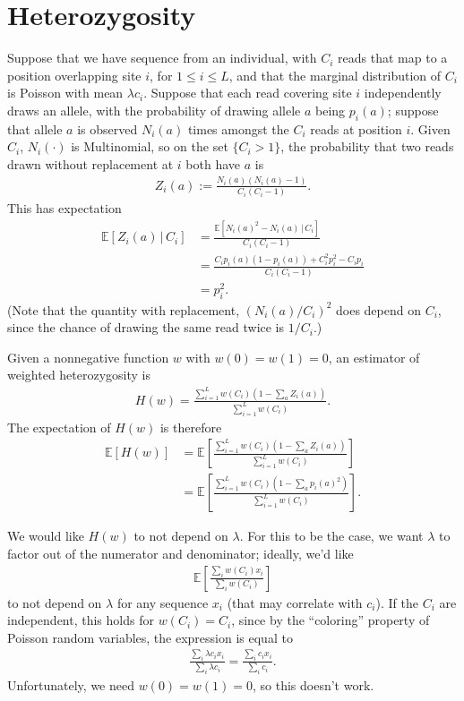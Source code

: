 \documentclass{article}
\newcommand{\E}{\mathbb{E}}
\newcommand{\given}{\,\vert\,}
\begin{document}
\section*{Heterozygosity}

Suppose that we have sequence from an individual,
with $C_i$ reads that map to a position overlapping site $i$, for $1 \le i \le L$,
and that the marginal distribution of $C_i$ is Poisson with mean $\lambda c_i$.
Suppose that each read covering site $i$ independently draws an allele,
with the probability of drawing allele $a$ being $p_i(a)$;
suppose that allele $a$ is observed $N_i(a)$ times amongst the $C_i$ reads at position $i$.
Given $C_i$, $N_i(\cdot)$ is Multinomial, so
on the set $\{ C_i > 1 \}$,
the probability that two reads drawn without replacement at $i$ both have $a$ is
\begin{align}
    Z_i(a) := \frac{N_i(a)(N_i(a)-1)}{C_i(C_i-1)} .
\end{align}
This has expectation
\begin{align}
\E\left[ Z_i(a) \given C_i \right] 
    & = \frac{ \E[ N_i(a)^2 - N_i(a) \given C_i ] }{ C_i (C_i-1) } \\
    & = \frac{ C_i p_i(a)(1-p_i(a)) + C_i^2 p_i^2 - C_i p_i }{ C_i (C_i-1) } \\
    & = p_i^2 .
\end{align}
(Note that the quantity with replacement, $(N_i(a)/C_i)^2$ does depend on $C_i$, 
since the chance of drawing the same read twice is $1/C_i$.)

Given a nonnegative function $w$ with $w(0)=w(1)=0$,
an estimator of weighted heterozygosity is
\begin{align}
    H(w) = \frac{ \sum_{i=1}^L w(C_i) \left( 1 - \sum_a Z_i(a) \right) }{ \sum_{i=1}^L w(C_i) } .
\end{align}
The expectation of $H(w)$ is therefore
\begin{align}
    \E[H(w)] &= \E \left[ \frac{ \sum_{i=1}^L w(C_i) \left( 1 - \sum_a Z_i(a) \right) }{ \sum_{i=1}^L w(C_i) } \right] \\
        &= \E\left[ \frac{ \sum_{i=1}^L w(C_i) \left( 1 - \sum_a p_i(a)^2 \right) }{ \sum_{i=1}^L w(C_i) } \right] .
\end{align}

We would like $H(w)$ to not depend on $\lambda$.
For this to be the case, we want $\lambda$ to factor out of the numerator and denominator;
ideally, we'd like
\begin{align}
    \E\left[ \frac{ \sum_i w(C_i) x_i }{ \sum_i w(C_i) } \right]
\end{align}
to not depend on $\lambda$ for any sequence $x_i$ (that may correlate with $c_i$).
If the $C_i$ are independent, this holds for $w(C_i)=C_i$, 
since by the ``coloring'' property of Poisson random variables, the expression
is equal to 
\begin{align}
    \frac{ \sum_i \lambda c_i x_i }{ \sum_i \lambda c_i }  =
    \frac{ \sum_i c_i x_i }{ \sum_i c_i }  .
\end{align}
Unfortunately, we need $w(0)=w(1)=0$, so this doesn't work.
\end{document}
